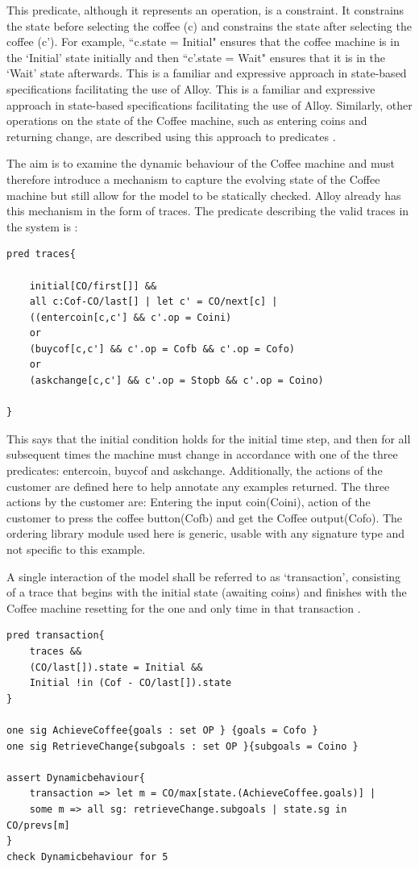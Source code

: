 \documentclass[a4paper,10pt]{report}
\begin{document}
This predicate, although it represents an operation, is a constraint. It constrains the state before selecting the coffee (c) and constrains the state after selecting the coffee (c'). For example, ``c.state = Initial" ensures that the coffee machine is in the `Initial’ state initially and then ``c'.state = Wait" ensures that it is in the `Wait' state afterwards. This is a familiar and expressive approach in state-based specifications facilitating the use of Alloy. This is a familiar and expressive approach in state-based specifications facilitating the use of Alloy. Similarly, other operations on the state of the Coffee machine, such as entering coins and returning change, are described using this approach to predicates \cite{Boyatt}.

The aim is to examine the dynamic behaviour of the Coffee machine and must therefore introduce a mechanism to capture the evolving state of the Coffee machine but still allow for the model to be statically checked. Alloy already has this mechanism in the form of traces. The predicate describing the valid traces in the system is \cite{Boyatt}:

\begin{verbatim}
pred traces{

	initial[CO/first[]] &&
	all c:Cof-CO/last[] | let c' = CO/next[c] |
	((entercoin[c,c'] && c'.op = Coini)
	or
	(buycof[c,c'] && c'.op = Cofb && c'.op = Cofo)
	or
	(askchange[c,c'] && c'.op = Stopb && c'.op = Coino)

}
\end{verbatim}

This says that the initial condition holds for the initial time step, and then for all subsequent times the machine must change in accordance with one of the three predicates: entercoin, buycof and askchange. Additionally, the actions of the customer are defined here to help annotate any examples returned. The three actions by the customer are: Entering the input coin(Coini), action of the customer to press the coffee button(Cofb) and get the Coffee output(Cofo). The ordering library module used here is generic, usable with any signature type and not specific to this example.

A single interaction of the model shall be referred to as `transaction’, consisting of a trace that begins with the initial state (awaiting coins) and finishes with the Coffee machine resetting for the one and only time in that transaction \cite{Boyatt}.

\begin{verbatim}
pred transaction{
	traces &&
	(CO/last[]).state = Initial &&
	Initial !in (Cof - CO/last[]).state
}

one sig AchieveCoffee{goals : set OP } {goals = Cofo }
one sig RetrieveChange{subgoals : set OP }{subgoals = Coino }

assert Dynamicbehaviour{
	transaction => let m = CO/max[state.(AchieveCoffee.goals)] |
	some m => all sg: retrieveChange.subgoals | state.sg in CO/prevs[m]
}
check Dynamicbehaviour for 5
\end{verbatim}
\end{document}

